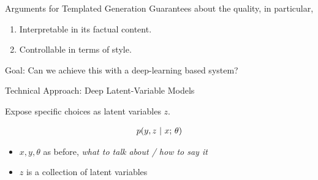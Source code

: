 







\begin{frame}{Arguments for Templated Generation}
Guarantees about the quality, in particular,
\air


\begin{enumerate}
\item Interpretable in its factual content.
  \air


  \air

\item Controllable in terms of style.
  \air



\end{enumerate}

\begin{center}
  Goal: Can we achieve this with a deep-learning based system?
\end{center}
\end{frame}


\begin{frame}{Technical Approach: Deep Latent-Variable Models}

  Expose specific choices as latent variables $z$.


\begin{align*}
p(y, z\ |\ x ; \, \theta)
\end{align*}

\begin{itemize}
    \item $x, y, \theta$ as before, \textit{what to talk about / how to say it}
    \item $z$ is a collection of latent variables
\end{itemize}



\end{frame}

